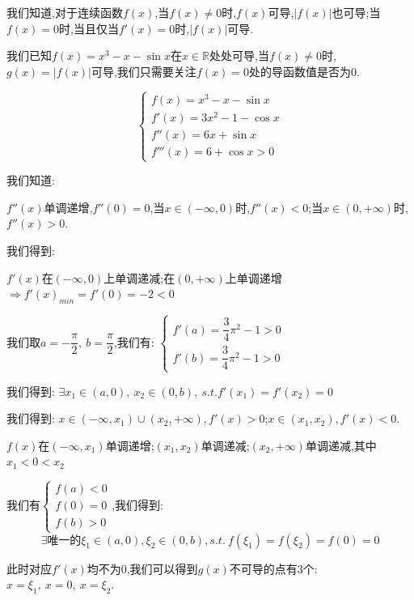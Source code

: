 \begin{solution}

	我们知道,对于连续函数$f(x)$,当$f(x)\neq 0$时,$f(x)$可导,$|f(x)|$也可导;当$f(x)=0$时,当且仅当$f'(x)=0$时,$|f(x)|$可导.
	
	我们已知$f(x)=x^3-x-\sin x$在$x\in\mathbb{R}$处处可导,当$f(x)\neq 0$时,$g(x)=|f(x)|$可导,我们只需要关注$f(x)=0$处的导函数值是否为$0$.
	
	$$\left\lbrace
	\begin{array}{l}
		f(x)=x^3-x-\sin x\\
		f'(x)=3x^2-1-\cos x\\
		f''(x)=6x+\sin x\\
		f'''(x)=6+\cos x>0
	\end{array}
	\right. $$
	
	我们知道:  
	
	$f''(x)$单调递增,$f''(0)=0$,当$x\in(-\infty,0)$时,$f''(x)<0$;当$x\in(0,+\infty)$时,$f''(x)>0$.
	
	我们得到:  
	
	$f'(x)$在$(-\infty,0)$上单调递减;在$(0,+\infty)$上单调递增$\Rightarrow f'(x)_{min}=f'(0)=-2<0$
	
	我们取$a=-\dfrac{\pi}{2},\ b=\dfrac{\pi}{2}$,我们有:  $\left\lbrace
	\begin{array}{l}
		f'(a)=\dfrac{3}{4}\pi^2-1>0\\
		f'(b)=\dfrac{3}{4}\pi^2-1>0
	\end{array}
	\right. $
	
	我们得到:  $\exists x_{1}\in(a,0),\ x_{2}\in(0,b),\ s.t. f'(x_{1})=f'(x_{2})=0$
	
	我们得到:  $x\in(-\infty,x_{1})\cup (x_{2},+\infty),f'(x)>0$;$x\in(x_{1},x_{2}),f'(x)<0$.
	
	$f(x)$在$(-\infty,x_{1})$单调递增;$(x_{1},x_{2})$单调递减;$(x_{2},+\infty)$单调递减,其中$x_{1}<0<x_{2}$
	
	我们有$\left\lbrace
	\begin{array}{l}
		f(a)<0\\
		f(0)=0\\
		f(b)>0
	\end{array}
	\right. $,我们得到:  
	$$\exists \text{唯一的}\xi_{1}\in(a,0),\xi_{2}\in(0,b),s.t.\ f(\xi_{1})=f(\xi_{2})=f(0)=0$$
	
	此时对应$f'(x)$均不为$0$,我们可以得到$g(x)$不可导的点有$3$个:  $x=\xi_{1},\ x=0,\ x=\xi_{2}$.
\end{solution}

